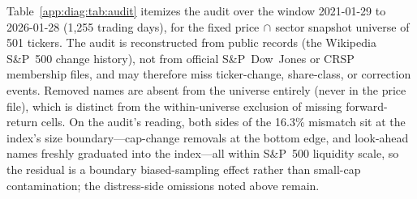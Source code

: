 \documentclass{article}
\begin{document}
Table~\ref{app:diag:tab:audit} itemizes the audit over the window 2021-01-29 to 2026-01-28 (1{,}255 trading days), for the fixed price$\,\cap\,$sector snapshot universe of 501 tickers. The audit is reconstructed from public records (the Wikipedia S\&P~500 change history), not from official S\&P~Dow~Jones or CRSP membership files, and may therefore miss ticker-change, share-class, or correction events. Removed names are absent from the universe entirely (never in the price file), which is distinct from the within-universe exclusion of missing forward-return cells.
On the audit's reading, both sides of the 16.3\% mismatch sit at the index's size boundary---cap-change removals at the bottom edge, and look-ahead names freshly graduated into the index---all within S\&P~500 liquidity scale, so the residual is a boundary biased-sampling effect rather than small-cap contamination; the distress-side omissions noted above remain.
\end{document}
